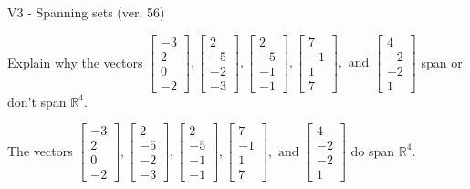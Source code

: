 \begin{exercise}
  \begin{exerciseTitle}V3 - Spanning sets (ver. 56)\end{exerciseTitle}
  \begin{exerciseStatement}
    Explain why the vectors \(\left[\begin{array}{r}
-3 \\
2 \\
0 \\
-2
\end{array}\right] , \left[\begin{array}{r}
2 \\
-5 \\
-2 \\
-3
\end{array}\right] , \left[\begin{array}{r}
2 \\
-5 \\
-1 \\
-1
\end{array}\right] , \left[\begin{array}{r}
7 \\
-1 \\
1 \\
7
\end{array}\right] , \text{ and } \left[\begin{array}{r}
4 \\
-2 \\
-2 \\
1
\end{array}\right]\) span or don't span \(\mathbb{R}^4\). 
	


  \end{exerciseStatement}
  \begin{exerciseAnswer}
   The vectors \(\left[\begin{array}{r}
-3 \\
2 \\
0 \\
-2
\end{array}\right] , \left[\begin{array}{r}
2 \\
-5 \\
-2 \\
-3
\end{array}\right] , \left[\begin{array}{r}
2 \\
-5 \\
-1 \\
-1
\end{array}\right] , \left[\begin{array}{r}
7 \\
-1 \\
1 \\
7
\end{array}\right] , \text{ and } \left[\begin{array}{r}
4 \\
-2 \\
-2 \\
1
\end{array}\right]\) 
  	 do  
	span \(\mathbb{R}^4\).
  



\end{exerciseAnswer}
\end{exercise}
